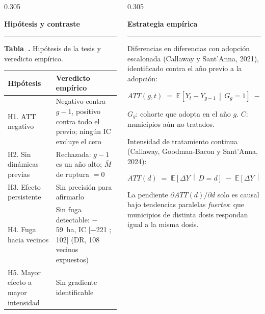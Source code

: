 \documentclass[final,t]{beamer}
\newcommand{\seccion}[2]{%
  \par\vspace{0.5\baselineskip}%
  {\color{dosel}\Large\bfseries #1\hfill{\color{tenue}\normalsize\mdseries #2}}\par
  \vspace{-0.35\baselineskip}%
  {\color{dosel}\rule{\linewidth}{2.2pt}}\par
  \vspace{0.25\baselineskip}%
}
\newcommand{\nota}[1]{{\color{tenue}\small #1\par}}
\newcounter{tabposter}
\newcommand{\tabcap}[2]{\refstepcounter{tabposter}\label{#1}%
  \nota{\textbf{Tabla~\thetabposter.} #2}}
\begin{document}
\begin{frame}[t]{}
\begin{columns}[t]
\begin{column}{0.305\paperwidth}
\seccion{Hipótesis y contraste}{}
\tabcap{tab:hipotesis}{Hipótesis de la tesis y veredicto empírico.}
\begin{center}
\begin{tabularx}{\linewidth}{lX}
\toprule
\rowcolor{dosel}
\textcolor{papel}{\textbf{Hipótesis}} & \textcolor{papel}{\textbf{Veredicto empírico}}\\
\midrule
H1. ATT negativo           & Negativo contra $g-1$, positivo contra todo el previo; ningún IC excluye el cero\\
H2. Sin dinámicas previas  & Rechazada: $g-1$ es un año alto; $\bar{M}$ de ruptura $=0$\\
H3. Efecto persistente     & Sin precisión para afirmarlo\\
H4. Fuga hacia vecinos     & Sin fuga detectable: $-$59~ha, IC [$-$221 ; 102] (DR, 108 vecinos expuestos)\\
H5. Mayor efecto a mayor intensidad & Sin gradiente identificable\\
\bottomrule
\end{tabularx}
\end{center}

\end{column}

\begin{column}{0.305\paperwidth}
\justifying

\seccion{Estrategia empírica}{}
\nota{Diferencias en diferencias con adopción escalonada (Callaway y Sant'Anna, 2021),
identificado contra el año previo a la adopción:}
\begin{tcolorbox}[colback=cajafondo,colframe=regla,boxrule=0.8pt,sharp corners]
\centering
\[
  ATT(g,t) \;=\; \mathbb{E}\!\left[Y_{t}-Y_{g-1}\,\middle|\,G_{g}=1\right]
               \;-\; \mathbb{E}\!\left[Y_{t}-Y_{g-1}\,\middle|\,C=1\right]
\]
\raggedright\nota{$G_g$: cohorte que adopta en el año $g$. $C$: municipios aún no tratados.}
\end{tcolorbox}

\nota{Intensidad de tratamiento continua (Callaway, Goodman-Bacon y Sant'Anna, 2024):}
\begin{tcolorbox}[colback=cajafondo,colframe=regla,boxrule=0.8pt,sharp corners]
\centering
\[
  ATT(d) \;=\; \mathbb{E}\!\left[\Delta Y \,\middle|\, D=d\right]
         \;-\; \mathbb{E}\!\left[\Delta Y \,\middle|\, D=0\right]
\]
\raggedright\nota{La pendiente $\partial ATT(d)/\partial d$ solo es causal bajo tendencias
paralelas \emph{fuertes}: que municipios de distinta dosis respondan igual a la misma dosis.}
\end{tcolorbox}


\end{column}
\end{columns}
\end{frame}
\end{document}

